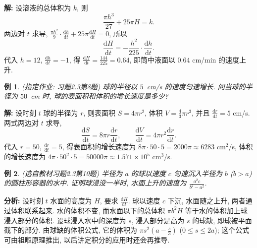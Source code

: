\documentclass[UTF8,openany]{ctexbook}
\theoremstyle{chinesetextbook}
\newtheorem{example}{例}[section]
\newenvironment{cnsolution}{\par\indent\textbf{解:} \ignorespaces}{\par}
\newcommand{\dd}{\mathrm d}
\begin{document}
\begin{cnsolution}
设溶液的总体积为 $k$, 则
\[
\frac{\pi h^3}{27}+25\pi H=k.
\]
两边对 $t$ 求导, $\displaystyle\frac{\pi h^2}9\cdot\frac{\dd h}{\dd t}+25\pi\frac{\dd H}{\dd t}=0$, 所以
\[
\frac{\dd H}{\dd t}=-\frac{h^2}{225}\cdot\frac{\dd h}{\dd t}.
\]
代入 $h=12$, $\displaystyle\frac{\dd h}{\dd t}=-1$, 得 $\displaystyle\frac{\dd H}{\dd t}=\frac{144}{225}=0.64$, 即筒中液面以 $0.64$ cm/min 的速度上升.
\end{cnsolution}
\begin{example}\label{ex:c2-h3-8}
\textnormal{(指定作业: 习题2.3第8题)} 球的半径以 $5$~cm/s 的速度匀速增长. 问当球的半径为 $50$~cm 时, 球的表面积和体积的增长速度是多少?
\end{example}
\begin{cnsolution}
设时刻 $t$ 球的半径为 $r$, 则表面积 $S=4\pi r^2$, 体积 $\displaystyle V=\frac43\pi r^3$, 并且 $\displaystyle\frac{\dd r}{\dd t}=5$ cm/s. 两式两边对 $t$ 求导,
\[
\frac{\dd S}{\dd t}=8\pi r\frac{\dd r}{\dd t},\qquad\frac{\dd V}{\dd t}=4\pi r^2\frac{\dd r}{\dd t}.
\]
代入 $r=50$, $\displaystyle\frac{\dd r}{\dd t}=5$, 得表面积的增长速度为 $8\pi\cdot50\cdot5=2000\pi\approx6283$ cm$^2$/s, 体积的增长速度为 $4\pi\cdot50^2\cdot5=50000\pi\approx1.571\times10^5$ cm$^3$/s.
\end{cnsolution}
\begin{example}\label{ex:c2-h3-10}
\textnormal{(选自教材习题2.3第10题)} 半径为 $a$ 的球以速度 $c$ 匀速沉入半径为 $b$ ($b>a$) 的圆柱形容器的水中. 证明球浸没一半时, 水面上升的速度为 $\displaystyle\frac{a^2c}{b^2-a^2}$.
\end{example}
\par\indent\textbf{分析:} 设时刻 $t$ 水面的高度为 $H$, 要求 $\displaystyle\frac{\dd H}{\dd t}$. 球以速度 $c$ 下沉, 水面随之上升, 两者通过体积联系起来. 水的体积不变, 而水面以下的总体积 $\pi b^2H$ 等于水的体积加上球浸入部分的体积. 设球浸入水中的深度为 $s$, 浸入部分是高为 $s$ 的球缺, 即球被平面截下的部分. 由球缺的体积公式, 它的体积为 $\displaystyle\pi s^2\left(a-\frac s3\right)$ ($0\le s\le2a$); 这个公式可由祖暅原理推出, 以后讲定积分的应用时还会再推导.
\end{document}
